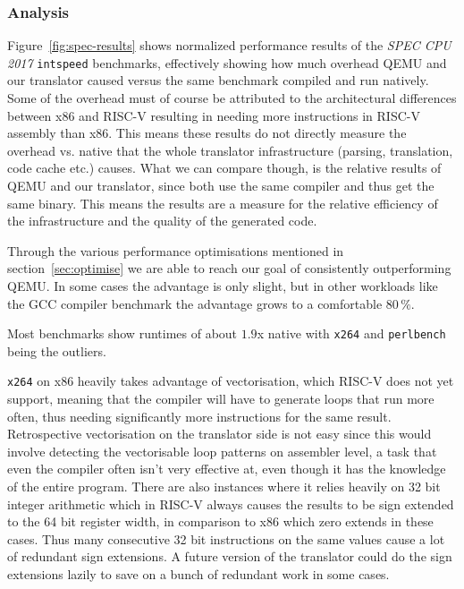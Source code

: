 \subsubsection{Analysis}
Figure~\ref{fig:spec-results} shows normalized performance results of the \textit{SPEC CPU 2017} \texttt{intspeed} benchmarks, effectively showing how much overhead QEMU and our translator caused versus the same benchmark compiled and run natively.
Some of the overhead must of course be attributed to the architectural differences between x86 and RISC-V resulting in needing more instructions in RISC-V assembly than x86.
This means these results do not directly measure the overhead vs. native that the whole translator infrastructure (parsing, translation, code cache etc.) causes.
What we can compare though, is the relative results of QEMU and our translator, since both use the same compiler and thus get the same binary.
This means the results are a measure for the relative efficiency of the infrastructure and the quality of the generated code.

Through the various performance optimisations mentioned in section~\vref{sec:optimise} we are able to reach our goal of consistently outperforming QEMU\@.
In some cases the advantage is only slight, but in other workloads like the GCC compiler benchmark the advantage grows to a comfortable $80\,\%$.

Most benchmarks show runtimes of about $1.9$x native with \texttt{x264} and \texttt{perlbench} being the outliers.

\texttt{x264} on x86 heavily takes advantage of vectorisation, which RISC-V does not yet support, meaning that the compiler will have to generate loops that run more often, thus needing significantly more instructions for the same result.
Retrospective vectorisation on the translator side is not easy since this would involve detecting the vectorisable loop patterns on assembler level, a task that even the compiler often isn't very effective at, even though it has the knowledge of the entire program.
There are also instances where it relies heavily on 32 bit integer arithmetic which in RISC-V always causes the results to be sign extended to the 64 bit register width, in comparison to x86 which zero extends in these cases.
Thus many consecutive 32 bit instructions on the same values cause a lot of redundant sign extensions.
A future version of the translator could do the sign extensions lazily to save on a bunch of redundant work in some cases.

